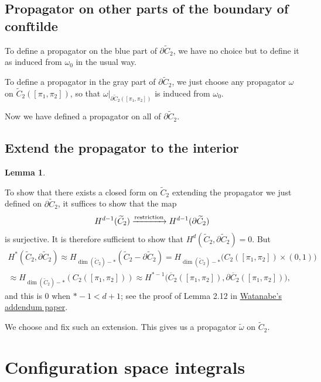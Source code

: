 \documentclass[11pt]{article}
\newtheorem{lmm}[thm]{Lemma}
\theoremstyle{definition}
\theoremstyle{remark}
\def\wt#1{\widetilde{#1}}
\def\ov#1{\overline{#1}}
\def\tn#1{\textnormal{#1}}
\begin{document}
\subsection{Propagator on other parts of the boundary of conftilde}

To define a propagator on the blue part of $\partial\wt{C}_2$, we have no choice but to define it as induced from $\omega_0$ in the usual way. 

To define a propagator in the gray part of $\partial\wt{C}_2$, we just choose any propagator $\omega$ on $\wt{C}_2([\pi_1,\pi_2])$, so that $\omega|_{\partial\wt{C}_2([\pi_1,\pi_2])}$ is induced from $\omega_0$. 

Now we have defined a propagator on all of $\partial\wt{C}_2$. 

\subsection{Extend the propagator to the interior}


\begin{lmm}

\end{lmm}


To show that there exists a closed form on $\wt{C}_2$ extending the propagator we just defined on $\partial\wt{C}_2$, 
it suffices to show that the map 
$$H^{d-1}(\wt{C}_2)\xrightarrow{\tn{restriction}}H^{d-1}(\partial\wt{C}_2)$$
is surjective. 
It is therefore sufficient to show that $H^d(\wt{C}_2,\partial\wt{C}_2)=0$. But 
\begin{align*}
H^*(\wt{C}_2,\partial\wt{C}_2)\approx
H_{\dim(\wt{C}_2)-*}(\wt{C}_2-\partial\wt{C}_2)=
H_{\dim(\wt{C}_2)-*}\big(C_2([\pi_1,\pi_2])\times (0,1)\big)\\
\approx
H_{\dim(\wt{C}_2)-*}({C}_2([\pi_1,\pi_2]))
\approx H^{*-1}\big(\ov{C}_2([\pi_1,\pi_2]),\partial\ov{C}_2([\pi_1,\pi_2])\big), 
\end{align*}
and this is 0 when $*-1<d+1$; see the proof of Lemma 2.12 in \href{https://arxiv.org/pdf/2109.01609}{Watanabe's addendum paper}. 

We choose and fix such an extension. This gives us a propagator $\wt\omega$ on $\wt{C}_2$. 

\section{Configuration space integrals}
\end{document}
